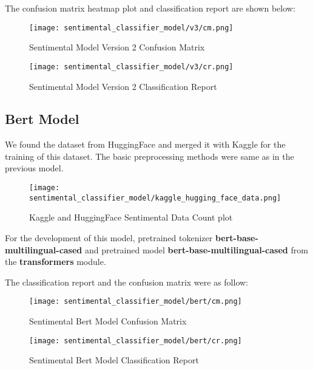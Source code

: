 The confusion matrix heatmap plot and classification report are shown below:


\begin{figure}[H]
    \centering
    \texttt{[image: sentimental\_classifier\_model/v3/cm.png]}
    \caption{Sentimental Model Version 2 Confusion Matrix}
    \label{fig:Sentimental Model Version 2 Confusion Matrix}
\end{figure}

\begin{figure}[H]
    \centering
    \texttt{[image: sentimental\_classifier\_model/v3/cr.png]}
    \caption{Sentimental Model Version 2 Classification Report}
    \label{fig:Sentimental Model Version 2 Classification Report}
\end{figure}

\subsection{Bert Model}
We found the dataset from HuggingFace and merged it with Kaggle for the training of this dataset. The basic preprocessing methods were same as in the previous model.
\begin{figure}[H]
    \centering
    \texttt{[image: sentimental\_classifier\_model/kaggle\_hugging\_face\_data.png]}
    \caption{Kaggle and HuggingFace Sentimental Data Count plot}
    \label{fig:Data distribution}
\end{figure}

For the development of this model, pretrained tokenizer \textbf{bert-base-multilingual-cased} and pretrained model \textbf{bert-base-multilingual-cased} from the \textbf{transformers} module.

The classification report and the confusion matrix were as follow:
\begin{figure}[H]
    \centering
    \texttt{[image: sentimental\_classifier\_model/bert/cm.png]}
    \caption{Sentimental Bert Model Confusion Matrix}
    \label{fig:Sentimental Bert Model Confusion Matrix}
\end{figure}

\begin{figure}[H]
    \centering
    \texttt{[image: sentimental\_classifier\_model/bert/cr.png]}
    \caption{Sentimental Bert Model Classification Report}
    \label{fig:Sentimental Bert Model Classification Report}
\end{figure}